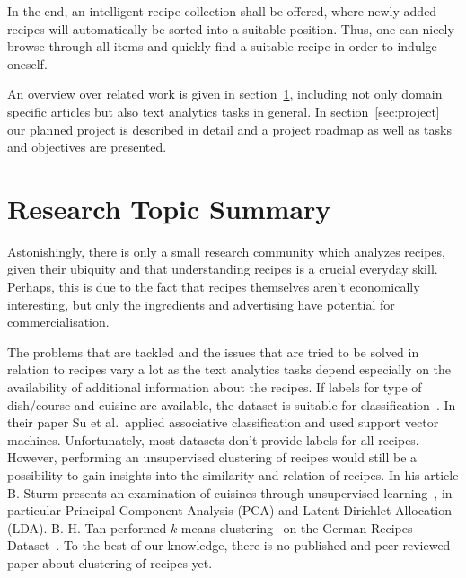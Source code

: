 \documentclass[
     12pt,         %
     a4paper,      %
     BCOR10mm,     %
     DIV14,        %
     ]{article}
\begin{document}
In the end, an intelligent recipe collection shall be offered, where newly added recipes will automatically be sorted into a suitable position. Thus, one can nicely browse through all items and quickly find a suitable recipe in order to indulge oneself.

An overview over related work is given in section~\ref{sec:research}, including not only domain specific articles but also text analytics tasks in general. In section~\ref{sec:project} our planned project is described in detail and a project roadmap as well as tasks and objectives are presented.

\section{Research Topic Summary}
\label{sec:research}

Astonishingly, there is only a small research community which analyzes recipes, given their ubiquity and that understanding recipes is a crucial everyday skill. Perhaps, this is due to the fact that recipes themselves aren't economically interesting, but only the ingredients and advertising have potential for commercialisation.

The problems that are tackled and the issues that are tried to be solved in relation to recipes vary a lot as the text analytics tasks depend especially on the availability of additional information about the recipes. If labels for type of dish/course and cuisine are available, the dataset is suitable for classification~\cite{recipeclassification, cultdiffusion}. In their paper Su et al.~applied associative classification and used support vector machines. Unfortunately, most datasets don't provide labels for all recipes. However, performing an unsupervised clustering of recipes would still be a possibility to gain insights into the similarity and relation of recipes. In his article B. Sturm presents an examination of cuisines through unsupervised learning~\cite{unsupervisedclustering}, in particular Principal Component Analysis (PCA) and Latent Dirichlet Allocation (LDA). B. H. Tan performed $k$-means clustering~\cite{clusteringrecipes} on the German Recipes Dataset~\cite{germanrecipesdataset}. To the best of our knowledge, there is no published and peer-reviewed paper about clustering of recipes yet.
\end{document}
